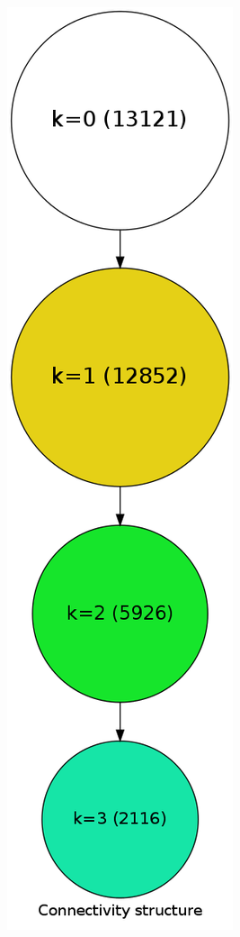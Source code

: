 \begin{landscape}
\begin{figure}[p]
{\includegraphics[scale=0.25]{figures/cohesive_blocks_lenny_2mode_random}
}
\hspace{.95in}
\subfloat[1 mode]{
\label{fig:cb_lenny_1m}
}
\end{figure}
\end{landscape}
